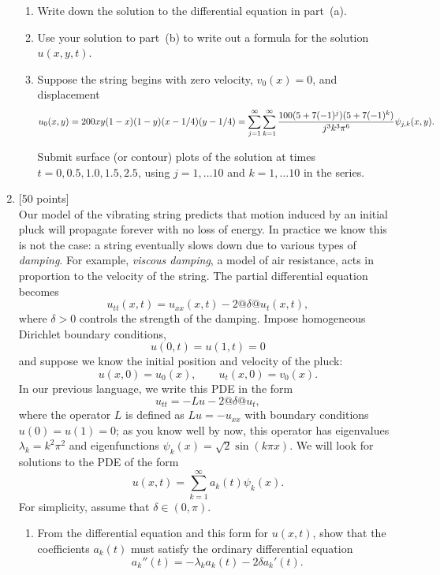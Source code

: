 \documentclass[10pt]{article}
\begin{document}
\begin{enumerate}
\begin{enumerate}
\item Write down the solution to the differential equation in part~(a).

\item Use your solution to part~(b) to write out a formula for the solution $u(x,y,t)$.
       
\item Suppose the string begins with zero velocity, $v_0(x)=0$, and displacement
         \[ u_0(x,y) = 200xy (1-x) (1-y)(x-1/4)(y-1/4) 
                     = \sum_{j=1}^\infty \sum_{k=1}^\infty 
                        {100 (5+7(-1)^j)(5+7(-1)^k)\over j^3 k^3 \pi^6} \psi_{j,k}(x,y). \]

      Submit surface (or contour) plots of the solution at times 
      $t=0, 0.5, 1.0, 1.5, 2.5$, using $j=1,\ldots 10$ and $k=1,\ldots 10$
      in the series.
\end{enumerate}

\item {[50 points]}\\ 
Our model of the vibrating string predicts that motion induced by an 
initial pluck will propagate forever with no loss of energy.
In practice we know this is not the case: a string 
eventually slows down due to various types of \emph{damping}.
For example, \emph{viscous damping}, a model of air resistance,
acts in proportion to the velocity of the string.
The partial differential equation becomes
\[ u_{tt}(x,t) = u_{xx}(x,t) - 2@\delta@u_t(x,t),\]
where $\delta> 0$ controls the strength of the damping.
Impose homogeneous Dirichlet boundary conditions,
\[ u(0,t) = u(1,t) = 0\]
and suppose we know the initial position and velocity of the pluck:
\[ u(x,0) = u_0(x), \qquad u_t(x,0) = v_0(x).\]
In our previous language, we write this PDE in the form 
\[ u_{tt} = -L u - 2@\delta@u_t,\]
where the operator $L$ is defined as $Lu = -u_{xx}$ with
boundary conditions $u(0)=u(1)=0$; as you know well by now,
this operator has eigenvalues $\lambda_k = k^2\pi^2$
and eigenfunctions $\psi_k(x) = \sqrt{2} \sin(k \pi x)$.
We will look for solutions to the PDE of the form
\[ u(x,t) = \sum_{k=1}^\infty a_k(t) \psi_k(x).\]
For simplicity, assume that $\delta\in(0,\pi)$.

\begin{enumerate}
\item From the differential equation and this form for $u(x,t)$,
      show that the coefficients $a_k(t)$ must satisfy the
      ordinary differential equation
\[ a_k''(t) = -\lambda_k a_k(t) - 2 \delta a_k'(t).\]


\end{enumerate}
\end{enumerate}
\end{document}
